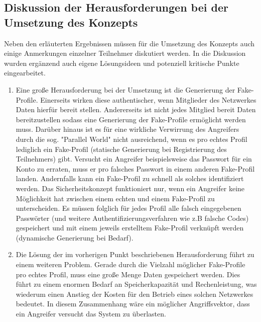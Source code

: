 \documentclass{sigchi}
\begin{document}
\subsection{Diskussion der Herausforderungen bei der Umsetzung des Konzepts}
\label{Diskussion}

Neben den erläuterten Ergebnissen müssen für die Umsetzung des Konzepts auch einige Anmerkungen einzelner Teilnehmer diskutiert werden. In die Diskussion wurden ergänzend auch eigene Lösungsideen und potenziell kritische Punkte eingearbeitet.

\begin{enumerate}
	
	\item Eine große Herausforderung bei der Umsetzung ist die Generierung der Fake-Profile. Einerseits wirken diese authentischer, wenn Mitglieder des Netzwerkes Daten hierfür bereit stellen. Andererseits ist nicht jedes Mitglied bereit Daten bereitzustellen sodass eine Generierung der Fake-Profile ermöglicht werden muss. Darüber hinaus ist es für eine wirkliche Verwirrung des Angreifers durch die sog. "Parallel World" nicht ausreichend, wenn es pro echtes Profil lediglich ein Fake-Profil (statische Generierung bei Registrierung des Teilnehmers) gibt. Versucht ein Angreifer beispielsweise das Passwort für ein Konto zu erraten, muss er pro falsches Passwort in einem anderen Fake-Profil landen. Andernfalls kann ein Fake-Profil zu schnell als solches identifiziert werden. Das Sicherheitskonzept funktioniert nur, wenn ein Angreifer keine Möglichkeit hat zwischen einem echten und einem Fake-Profil zu unterscheiden. Es müssen folglich für jedes Profil alle falsch eingegebenen Passwörter (und weitere Authentifizierungsverfahren wie z.B falsche Codes) gespeichert und mit einem jeweils erstelltem Fake-Profil verknüpft werden (dynamische Generierung bei Bedarf).
	\item Die Lösung der im vorherigen Punkt beschriebenen Herausforderung führt zu einem weiteren Problem. Gerade durch die Vielzahl möglicher Fake-Profile pro echtes Profil, muss eine große Menge Daten gespeichert werden. Dies führt zu einem enormen Bedarf an Speicherkapazität und Rechenleistung, was wiederum einen Anstieg der Kosten für den Betrieb eines solchen Netzwerkes bedeutet. In diesem Zusammenhang wäre ein möglicher Angriffsvektor, dass ein Angreifer versucht das System zu überlasten. 

\end{enumerate}
\end{document}
